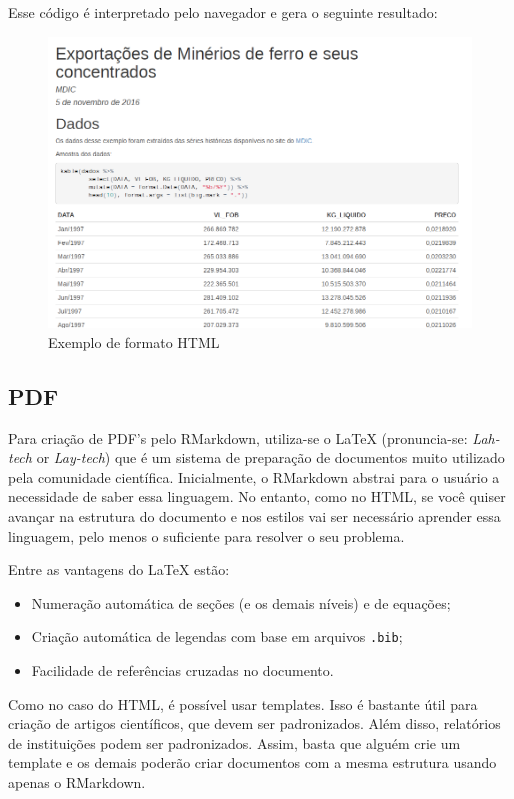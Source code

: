 \documentclass[]{book}
\begin{document}
Esse código é interpretado pelo navegador e gera o seguinte resultado:

\begin{figure}
\centering
\includegraphics{images/exemplo_html.png}
\caption{Exemplo de formato HTML}
\end{figure}

\subsection{PDF}\label{pdf}

Para criação de PDF's pelo RMarkdown, utiliza-se o LaTeX (pronuncia-se:
\emph{Lah-tech} or \emph{Lay-tech}) que é um sistema de preparação de
documentos muito utilizado pela comunidade científica. Inicialmente, o
RMarkdown abstrai para o usuário a necessidade de saber essa linguagem.
No entanto, como no HTML, se você quiser avançar na estrutura do
documento e nos estilos vai ser necessário aprender essa linguagem, pelo
menos o suficiente para resolver o seu problema.

Entre as vantagens do LaTeX estão:

\begin{itemize}
\item
  Numeração automática de seções (e os demais níveis) e de equações;
\item
  Criação automática de legendas com base em arquivos \texttt{.bib};
\item
  Facilidade de referências cruzadas no documento.
\end{itemize}

Como no caso do HTML, é possível usar templates. Isso é bastante útil
para criação de artigos científicos, que devem ser padronizados. Além
disso, relatórios de instituições podem ser padronizados. Assim, basta
que alguém crie um template e os demais poderão criar documentos com a
mesma estrutura usando apenas o RMarkdown.
\end{document}
